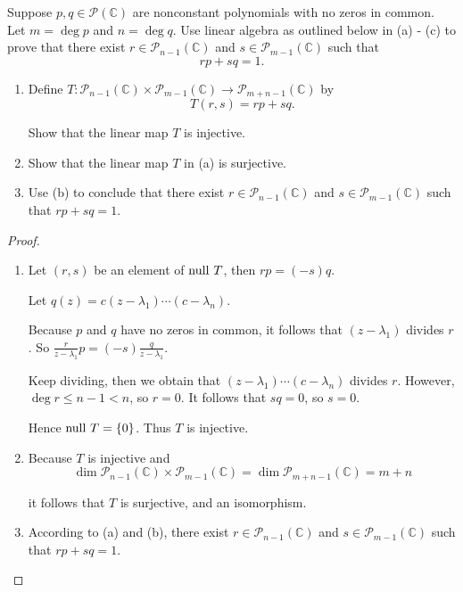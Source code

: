\begin{exercise}
    Suppose $p, q\in\mathscr{P}(\mathbb{C})$ are nonconstant polynomials with no zeros in common. Let $m = \deg{p}$ and $n = \deg{q}$. Use linear algebra as outlined below in (a) {-} (c) to prove that there exist $r\in\mathscr{P}_{n-1}(\mathbb{C})$ and $s\in\mathscr{P}_{m-1}(\mathbb{C})$ such that
    \[
        rp + sq = 1.
    \]

    \begin{enumerate}[label={(\alph*)}]
        \item Define $T: \mathscr{P}_{n-1}(\mathbb{C})\times\mathscr{P}_{m-1}(\mathbb{C})\to \mathscr{P}_{m+n-1}(\mathbb{C})$ by
              \[
                  T(r, s) = rp + sq.
              \]

              Show that the linear map $T$ is injective.
        \item Show that the linear map $T$ in (a) is surjective.
        \item Use (b) to conclude that there exist $r\in\mathscr{P}_{n-1}(\mathbb{C})$ and $s\in\mathscr{P}_{m-1}(\mathbb{C})$ such that $rp + sq = 1$.
    \end{enumerate}
\end{exercise}

\begin{proof}
    \begin{enumerate}[label={(\alph*)}]
        \item Let $(r, s)$ be an element of $\operatorname{null}\,{T}$, then $rp = (-s)q$.

              Let $q(z) = c(z - \lambda_{1})\cdots (c - \lambda _{n})$.

              Because $p$ and $q$ have no zeros in common, it follows that $(z - \lambda_{1})$ divides $r$. So $\frac{r}{z - \lambda_{1}}p = (-s)\frac{q}{z - \lambda_{1}}$.

              Keep dividing, then we obtain that $(z - \lambda_{1})\cdots (c - \lambda _{n})$ divides $r$. However, $\deg r \leq n-1 < n$, so $r = 0$. It follows that $sq = 0$, so $s = 0$.

              Hence $\operatorname{null}\,{T} = \{0\}$. Thus $T$ is injective.
        \item Because $T$ is injective and
              \[
                  \dim \mathscr{P}_{n-1}(\mathbb{C})\times\mathscr{P}_{m-1}(\mathbb{C}) = \dim \mathscr{P}_{m+n-1}(\mathbb{C}) = m + n
              \]

              it follows that $T$ is surjective, and an isomorphism.
        \item According to (a) and (b), there exist $r\in\mathscr{P}_{n-1}(\mathbb{C})$ and $s\in\mathscr{P}_{m-1}(\mathbb{C})$ such that $rp + sq = 1$.
    \end{enumerate}
\end{proof}
\newpage
